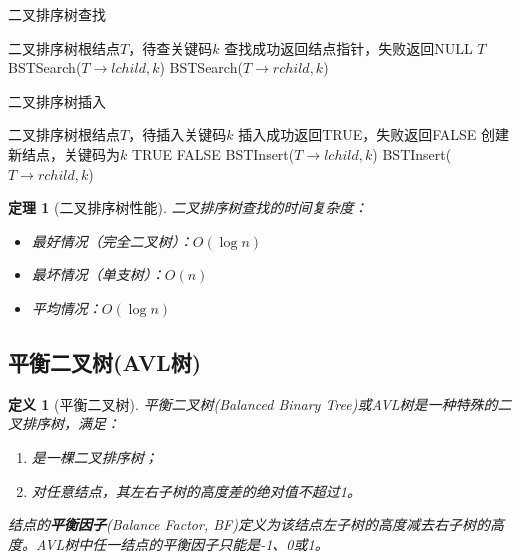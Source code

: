 \documentclass[12pt,a4paper]{amsart}
\newtheorem{definition}{定义}[section]
\newtheorem{theorem}{定理}[section]
\begin{document}
\begin{algorithm}
\caption{二叉排序树查找}
\begin{algorithmic}[1]
\REQUIRE 二叉排序树根结点$T$，待查关键码$k$
\ENSURE 查找成功返回结点指针，失败返回NULL
    \RETURN $T$
    \RETURN BSTSearch($T \rightarrow lchild, k$)
\ELSE
    \RETURN BSTSearch($T \rightarrow rchild, k$)
\ENDIF
\end{algorithmic}
\end{algorithm}

\begin{algorithm}
\caption{二叉排序树插入}
\begin{algorithmic}[1]
\REQUIRE 二叉排序树根结点$T$，待插入关键码$k$
\ENSURE 插入成功返回TRUE，失败返回FALSE
    \STATE 创建新结点，关键码为$k$
    \RETURN TRUE
    \RETURN FALSE 
    \RETURN BSTInsert($T \rightarrow lchild, k$)
\ELSE
    \RETURN BSTInsert($T \rightarrow rchild, k$)
\ENDIF
\end{algorithmic}
\end{algorithm}

\begin{theorem}[二叉排序树性能]
二叉排序树查找的时间复杂度：
\begin{itemize}
\item 最好情况（完全二叉树）：$O(\log n)$
\item 最坏情况（单支树）：$O(n)$
\item 平均情况：$O(\log n)$
\end{itemize}
\end{theorem}

\subsection{平衡二叉树(AVL树)}

\begin{definition}[平衡二叉树]
平衡二叉树(Balanced Binary Tree)或AVL树是一种特殊的二叉排序树，满足：
\begin{enumerate}
\item 是一棵二叉排序树；
\item 对任意结点，其左右子树的高度差的绝对值不超过1。
\end{enumerate}
结点的\textbf{平衡因子}(Balance Factor, BF)定义为该结点左子树的高度减去右子树的高度。AVL树中任一结点的平衡因子只能是-1、0或1。
\end{definition}
\end{document}
